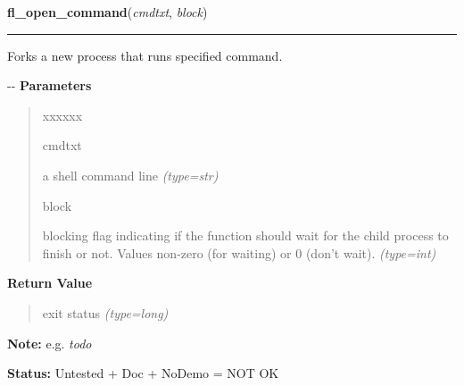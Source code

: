 \hspace{.8\funcindent}\begin{boxedminipage}{\funcwidth}

    \raggedright \textbf{fl\_open\_command}(\textit{cmdtxt}, \textit{block})

    \vspace{-1.5ex}

    \rule{\textwidth}{0.5\fboxrule}
\setlength{\parskip}{2ex}

Forks a new process that runs specified command.

-{}-
\setlength{\parskip}{1ex}
      \textbf{Parameters}
      \vspace{-1ex}

      \begin{quote}
        \begin{Ventry}{xxxxxx}

          \item[cmdtxt]


a shell command line
            {\it (type=str)}

          \item[block]


blocking flag indicating if the function should wait for the child
process to finish or not. Values non-zero (for waiting) or 0 (don't
wait).
            {\it (type=int)}

        \end{Ventry}

      \end{quote}

      \textbf{Return Value}
    \vspace{-1ex}

      \begin{quote}

exit status
      {\it (type=long)}

      \end{quote}

\textbf{Note:} 
e.g. \emph{todo}


\textbf{Status:} 
Untested + Doc + NoDemo = NOT OK


    \end{boxedminipage}

    \label{xformslib:flgoodies:fl_end_command}

    \vspace{0.5ex}

